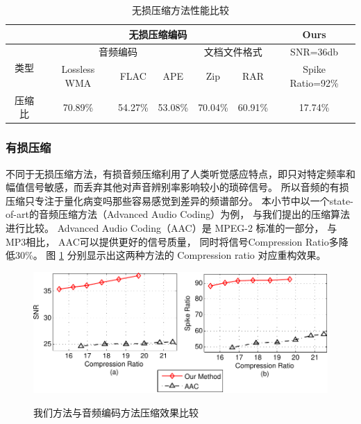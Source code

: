 \begin{table}[ht]%
\caption{无损压缩方法性能比较} %
\label{tab:compression_ratio_comp} \centering
\begin{tabular}{|c||c|c|c|c|c|c|}%
\hline
 & \multicolumn{5}{c|}{无损压缩编码} & Ours\\
  \hline \hline
 \multirow{2}{*}{类型} & \multicolumn{3}{c|}{音频编码} & \multicolumn{2}{c|}{文档文件格式} & SNR=36db\\
 \cline{2-6}
 & Lossless WMA & FLAC & APE & Zip & RAR &Spike Ratio=92\%\\
 \cline{1-7}
 压缩比 & 70.89\% & 54.27\% & 53.08\% & 70.04\% & 60.91\% & 17.74\%\\
\hline
\end{tabular}
\end{table}



\subsubsection{有损压缩}
不同于无损压缩方法，有损音频压缩利用了人类听觉感应特点，即只对特定频率和幅值信号敏感，而丢弃其他对声音辨别率影响较小的琐碎信号。 所以音频的有损压缩只专注于量化病变吗那些容易感觉到差异的频谱部分。 本小节中以一个state-of-art的音频压缩方法（Advanced Audio Coding）为例， 与我们提出的压缩算法进行比较。 Advanced Audio Coding（AAC）是 MPEG-2 标准的一部分， 与MP3相比， AAC可以提供更好的信号质量， 同时将信号Compression Ratio多降低30\%。 图 \ref{fig:Comparison-AAC and Ours} 分别显示出这两种方法的 Compression ratio 对应重构效果。


\begin{figure}
  \centering
  \includegraphics{Pictures/Compression/f13-crop.pdf}\\
  \caption{ 我们方法与音频编码方法压缩效果比较}\label{fig:Comparison-AAC and Ours}
\end{figure}


